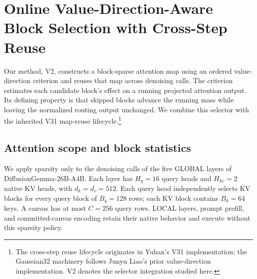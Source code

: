 
\section{Online Value-Direction-Aware Block Selection with Cross-Step Reuse}
\label{sec:v2-method}

Our method, V2, constructs a block-sparse attention map using an ordered
value-direction criterion and reuses that map across denoising calls.
The criterion estimates each candidate block's effect on a running projected
attention output. Its defining property is that skipped blocks advance the
running mass while leaving the normalized routing output unchanged.
We combine this selector with the inherited V31 map-reuse lifecycle.\footnote{The
cross-step reuse lifecycle originates in Yuhan's V31 implementation; the
Gaussian32 machinery follows Junyu Liao's prior value-direction implementation.
V2 denotes the selector integration studied here.}

\subsection{Attention scope and block statistics}
\label{sec:v2-statistics}

We apply sparsity only to the denoising calls of the five GLOBAL layers of
DiffusionGemma-26B-A4B. Each layer has $H_q=16$ query heads and $H_{kv}=2$
native KV heads, with $d_k=d_v=512$. Each query head independently selects
KV blocks for every query block of $B_q=128$ rows; each KV block contains
$B_k=64$ keys. A canvas has at most $C=256$ query rows. LOCAL layers,
prompt prefill, and committed-canvas encoding retain their native behavior
and execute without this sparsity policy.

